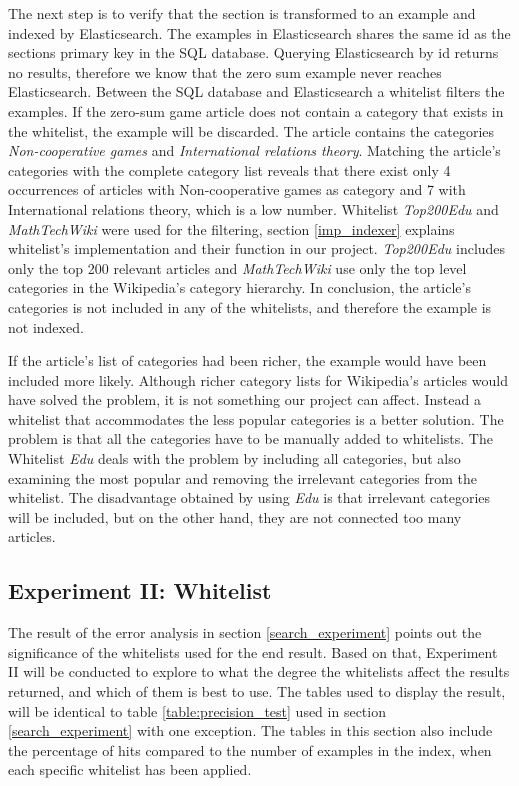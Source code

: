 The next step is to verify that the section is transformed to an example and indexed by Elasticsearch. The examples in Elasticsearch shares the same id as the sections primary key in the SQL database. Querying Elasticsearch by id returns no results, therefore we know that the zero sum example never reaches Elasticsearch. Between the SQL database and Elasticsearch a whitelist filters the examples. If the zero-sum game article does not contain a category that exists in the whitelist, the example will be discarded. The article contains the categories \textit{Non-cooperative games} and \textit{International relations theory}. Matching the article's categories with the complete category list reveals that there exist only 4 occurrences of articles with Non-cooperative games as category and 7 with International relations theory, which is a low number. Whitelist \textit{Top200Edu} and \textit{MathTechWiki} were used for the filtering, section \ref{imp_indexer} explains whitelist's implementation and their function in our project. \textit{Top200Edu} includes only the top 200 relevant articles and \textit{MathTechWiki} use only the top level categories in the Wikipedia's category hierarchy. In conclusion, the article's categories is not included in any of the whitelists, and therefore the example is not indexed.

If the article's list of categories had been richer, the example would have been included more likely. Although richer category lists for Wikipedia's articles would have solved the problem, it is not something our project can affect. Instead a whitelist that accommodates the less popular categories is a better solution. The problem is that all the categories have to be manually added to whitelists. The Whitelist \textit{Edu} deals with the problem by including all categories, but also examining the most popular and removing the irrelevant categories from the whitelist. The disadvantage obtained by using \textit{Edu} is that irrelevant categories will be included, but on the other hand, they are not connected too many articles. 

\subsection{Experiment II: Whitelist}

The result of the error analysis in section \ref{search_experiment} points out the significance of the whitelists used for the end result. Based on that, Experiment II will be conducted to explore to what the degree the whitelists affect the results returned, and which of them is best to use. The tables used to display the result, will be identical to table \ref{table:precision_test} used in section \ref{search_experiment} with one exception. The tables in this section also include the percentage of hits compared to the number of examples in the index, when each specific whitelist has been applied. 

